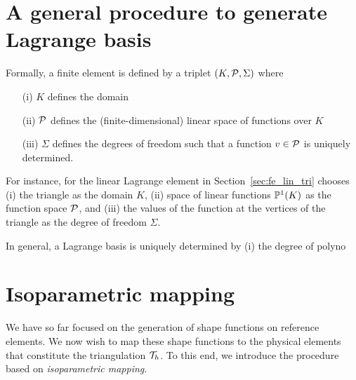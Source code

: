 \section{A general procedure to generate Lagrange basis}
Formally, a finite element is defined by a triplet $(K,\mathcal{P},\Sigma)$ where
\begin{itemize}
\item[(i)] $K$ defines the domain
\item[(ii)] $\mathcal{P}$ defines the (finite-dimensional) linear space of functions over $K$
\item[(iii)] $\Sigma$ defines the degrees of freedom such that a function $v \in \mathcal{P}$ is uniquely determined.
\end{itemize}
For instance, for the linear Lagrange element in Section~\ref{sec:fe_lin_tri} chooses (i) the triangle as the domain $K$, (ii) space of linear functions $\mathbb{P}^1(K)$ as the function space $\mathcal{P}$, and (iii) the values of the function at the vertices of the triangle as the degree of freedom $\Sigma$. 

In general, a Lagrange basis is uniquely determined by (i) the degree of polyno


\section{Isoparametric mapping}
We have so far focused on the generation of shape functions on reference elements.  We now wish to map these shape functions to the physical elements that constitute the triangulation $\mathcal{T}_h$.  To this end, we introduce the procedure based on \emph{isoparametric mapping}.

